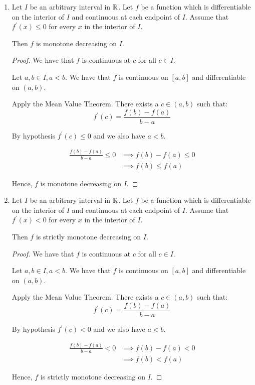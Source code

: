 \documentclass[12pt, letterpaper]{article}
\begin{document}
\begin{enumerate}[label=\bfseries2\alph*)]

\item Let $I$ be an arbitrary interval in $\mathbb{R}$. Let $f$ be a function which is 
differentiable on the interior of $I$ and continuous at each endpoint of $I$. 
Assume that $f^\prime(x) \leq 0$ for every $x$ in the interior of $I$. 

Then $f$ is monotone decreasing on $I$.

\begin{proof}
    We have that $f$ is continuous at $c$ for all $c \in I$.

    Let $a,b \in I, a<b$. We have that $f$ is continuous on $[a,b]$ and 
    differentiable on $(a,b)$. 

    Apply the Mean Value Theorem. There exists a $c \in (a,b)$ such that:
    \[f^\prime(c) = \frac{f(b) - f(a)}{b-a} \]

    By hypothesis $f^\prime (c) \leq 0$ and we also have $a < b$.

    \begin{align*}
        \frac{f(b) - f(a)}{b-a} \leq 0 &\implies f(b)-f(a) \leq 0 \\
                                       &\implies f(b) \leq f(a)
    \end{align*}

    Hence, $f$ is monotone decreasing on $I$.
\end{proof}


\item Let $I$ be an arbitrary interval in $\mathbb{R}$. Let $f$ be a function which is 
differentiable on the interior of $I$ and continuous at each endpoint of $I$. 
Assume that $f^\prime(x) < 0$ for every $x$ in the interior of $I$. 

Then $f$ is strictly monotone decreasing on $I$.

\begin{proof}
    We have that $f$ is continuous at $c$ for all $c \in I$.

    Let $a,b \in I, a<b$. We have that $f$ is continuous on $[a,b]$ and 
    differentiable on $(a,b)$. 

    Apply the Mean Value Theorem. There exists a $c \in (a,b)$ such that:
    \[f^\prime(c) = \frac{f(b) - f(a)}{b-a} \]

    By hypothesis $f^\prime (c) < 0$ and we also have $a < b$.

    \begin{align*}
        \frac{f(b) - f(a)}{b-a} < 0 &\implies f(b)-f(a) < 0 \\
                                       &\implies f(b) < f(a)
    \end{align*}

    Hence, $f$ is strictly monotone decreasing on $I$.
\end{proof}
\end{enumerate}
\end{document}
